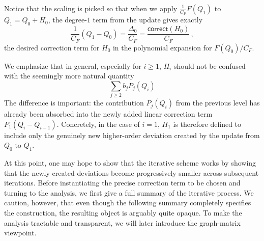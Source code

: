 \documentclass[12pt]{article}
\newcommand{\corr}{\mathsf{correct}}
\newcommand{\Authornote}[3]{{\sf\footnotesize\color{#3}{[#1: #2]}}}
\newcommand{\Authornote}[3]{}
\newcommand{\jnote}[1]{\Authornote{Jeff}{#1}{blue}}
\newcommand{\anote}[1]{\Authornote{Aaron}{#1}{cyan}}
\begin{document}
Notice that the scaling is picked so %
that when we apply $\frac{1}{C_F} F(Q_1)$ to $Q_1 = Q_0 + H_0$, the degree-$1$ term from the update gives exactly \[
\frac{1}{C_F} (Q_1-Q_0) = \frac{\Delta_0}{C_F} =  \frac{\corr(H_0) }{C_F} \,, \] the desired correction term for $H_0$ in the polynomial expansion for $F(Q_0)/C_F$.

We emphasize that in general, especially for $i\ge 1$, \(H_i\) should not be confused with the seemingly more natural quantity %
\[ 
\sum_{j\ge 2} b_j P_j(Q_i)
\]
The difference is important: the contribution \(P_j(Q_i)\) from the previous level has already been absorbed into the newly added linear correction term \(P_1(Q_i-Q_{i-1})\).  Concretely, in the case of $i=1$, \(H_1\) is therefore defined to include only the genuinely new higher-order deviation created by the update from \(Q_0\) to \(Q_1\).


At this point, one may hope to show that the iterative scheme works by showing
that the newly created deviations become progressively smaller across subsequent
iterations. Before instantiating the precise correction term to be chosen and turning to the analysis, we first give a full summary of the iterative process. We caution, however, that even though the following summary completely specifies the construction, the resulting object is arguably quite opaque. 
To make the analysis tractable and transparent, we will later introduce the graph-matrix viewpoint. 
\end{document}
